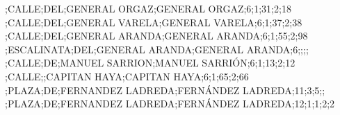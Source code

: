 \begin{tiny}
;CALLE;DEL;GENERAL ORGAZ;GENERAL ORGAZ;6;1;31;2;18
;CALLE;DEL;GENERAL VARELA;GENERAL VARELA;6;1;37;2;38
;CALLE;DEL;GENERAL ARANDA;GENERAL ARANDA;6;1;55;2;98
;ESCALINATA;DEL;GENERAL ARANDA;GENERAL ARANDA;6;;;;
;CALLE;DE;MANUEL SARRION;MANUEL SARRIÓN;6;1;13;2;12
;CALLE;;CAPITAN HAYA;CAPITAN HAYA;6;1;65;2;66
;PLAZA;DE;FERNANDEZ LADREDA;FERNÁNDEZ LADREDA;11;3;5;;
;PLAZA;DE;FERNANDEZ LADREDA;FERNÁNDEZ LADREDA;12;1;1;2;2
\end{tiny}




 
